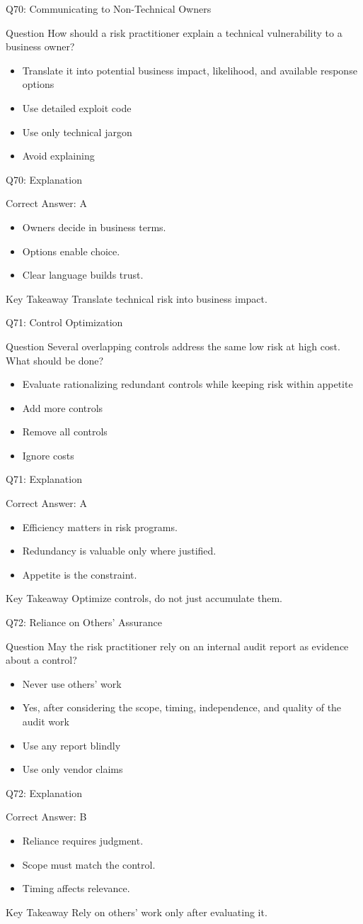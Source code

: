 \documentclass[aspectratio=169]{beamer}
\newcommand{\hq}[7]{%
	\begin{frame}{Q#1: #2}
		\begin{block}{Question}
			#3
		\end{block}
		\begin{itemize}
			#4
		\end{itemize}
	\end{frame}
	\begin{frame}{Q#1: Explanation}
		\begin{block}{Correct Answer: #5}
			\begin{itemize}
				#6
			\end{itemize}
		\end{block}
		\begin{alertblock}{Key Takeaway}
			#7
		\end{alertblock}
	\end{frame}
}
\begin{document}
	\hq{70}{Communicating to Non-Technical Owners}
	{How should a risk practitioner explain a technical vulnerability to a business owner?}
	{\item[\textbf{(A)}] Translate it into potential business impact, likelihood, and available response options
		\item[\textbf{(B)}] Use detailed exploit code
		\item[\textbf{(C)}] Use only technical jargon
		\item[\textbf{(D)}] Avoid explaining}
	{A}
	{\item Owners decide in business terms.
		\item Options enable choice.
		\item Clear language builds trust.}
	{Translate technical risk into business impact.}
	
	\hq{71}{Control Optimization}
	{Several overlapping controls address the same low risk at high cost. What should be done?}
	{\item[\textbf{(A)}] Evaluate rationalizing redundant controls while keeping risk within appetite
		\item[\textbf{(B)}] Add more controls
		\item[\textbf{(C)}] Remove all controls
		\item[\textbf{(D)}] Ignore costs}
	{A}
	{\item Efficiency matters in risk programs.
		\item Redundancy is valuable only where justified.
		\item Appetite is the constraint.}
	{Optimize controls, do not just accumulate them.}
	
	\hq{72}{Reliance on Others' Assurance}
	{May the risk practitioner rely on an internal audit report as evidence about a control?}
	{\item[\textbf{(A)}] Never use others' work
		\item[\textbf{(B)}] Yes, after considering the scope, timing, independence, and quality of the audit work
		\item[\textbf{(C)}] Use any report blindly
		\item[\textbf{(D)}] Use only vendor claims}
	{B}
	{\item Reliance requires judgment.
		\item Scope must match the control.
		\item Timing affects relevance.}
	{Rely on others' work only after evaluating it.}
	
\end{document}

